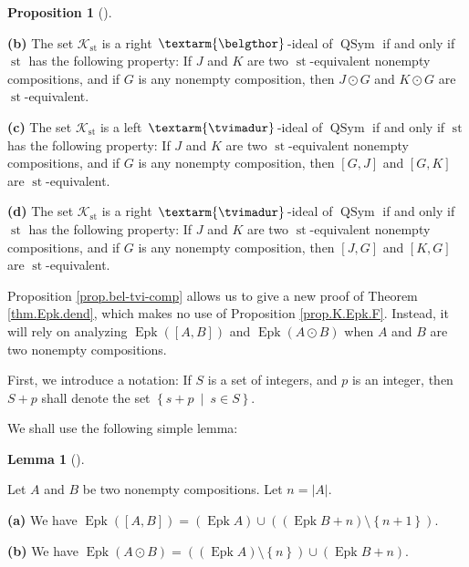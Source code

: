 \documentclass[numbers=enddot,12pt,final,onecolumn,notitlepage]{scrartcl}%
\theoremstyle{definition}
\newtheorem{lem}[theo]{Lemma}
\newenvironment{lemma}[1][]
{\begin{lem}[#1]\begin{leftbar}}
{\end{leftbar}\end{lem}}
\newtheorem{prop}[theo]{Proposition}
\newenvironment{proposition}[1][]
{\begin{prop}[#1]\begin{leftbar}}
{\end{leftbar}\end{prop}}
\newenvironment{verlong}{}{}
\newcommand{\tvi}{\left. \textarm{\tvimadur} \right.}
\newcommand{\bel}{\left. \textarm{\belgthor} \right.}
\begin{document}
\begin{verlong}
\begin{proposition}
\textbf{(b)} The set $\mathcal{K}_{\operatorname*{st}}$ is a right
$\bel$-ideal of $\operatorname*{QSym}$ if and only if $\operatorname*{st}$ has
the following property: If $J$ and $K$ are two $\operatorname*{st}$-equivalent
nonempty compositions, and if $G$ is any nonempty composition, then $J\odot G$
and $K\odot G$ are $\operatorname*{st}$-equivalent.

\textbf{(c)} The set $\mathcal{K}_{\operatorname*{st}}$ is a left $\tvi$-ideal
of $\operatorname*{QSym}$ if and only if $\operatorname*{st}$ has the
following property: If $J$ and $K$ are two $\operatorname*{st}$-equivalent
nonempty compositions, and if $G$ is any nonempty composition, then $\left[
G,J\right]  $ and $\left[  G,K\right]  $ are $\operatorname*{st}$-equivalent.

\textbf{(d)} The set $\mathcal{K}_{\operatorname*{st}}$ is a right
$\tvi$-ideal of $\operatorname*{QSym}$ if and only if $\operatorname*{st}$ has
the following property: If $J$ and $K$ are two $\operatorname*{st}$-equivalent
nonempty compositions, and if $G$ is any nonempty composition, then $\left[
J,G\right]  $ and $\left[  K,G\right]  $ are $\operatorname*{st}$-equivalent.
\end{proposition}

Proposition \ref{prop.bel-tvi-comp} allows us to give a new proof of Theorem
\ref{thm.Epk.dend}, which makes no use of Proposition \ref{prop.K.Epk.F}.
Instead, it will rely on analyzing $\operatorname*{Epk}\left(  \left[
A,B\right]  \right)  $ and $\operatorname*{Epk}\left(  A\odot B\right)  $ when
$A$ and $B$ are two nonempty compositions.

First, we introduce a notation: If $S$ is a set of integers, and $p$ is an
integer, then $S+p$ shall denote the set $\left\{  s+p\ \mid\ s\in S\right\}
$.

We shall use the following simple lemma:

\begin{lemma}
\label{lem.Epk.AB}Let $A$ and $B$ be two nonempty compositions. Let
$n=\left\vert A\right\vert $.

\textbf{(a)} We have $\operatorname*{Epk}\left(  \left[  A,B\right]  \right)
=\left(  \operatorname*{Epk}A\right)  \cup\left(  \left(  \operatorname*{Epk}%
B+n\right)  \setminus\left\{  n+1\right\}  \right)  $.

\textbf{(b)} We have $\operatorname*{Epk}\left(  A\odot B\right)  =\left(
\left(  \operatorname*{Epk}A\right)  \setminus\left\{  n\right\}  \right)
\cup\left(  \operatorname*{Epk}B+n\right)  $.
\end{lemma}


\end{verlong}
\end{document}
